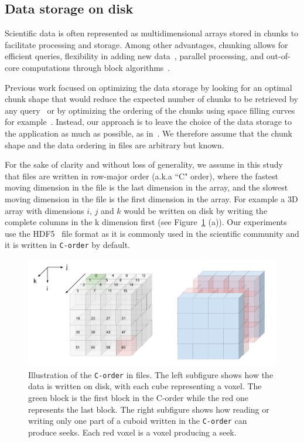 \documentclass[conference]{IEEEtran}
\begin{document}
\subsection{Data storage on disk}
Scientific data is often represented as multidimensional arrays stored in
chunks to facilitate processing and storage. Among other advantages, chunking
allows for efficient queries, flexibility in adding new
data~\cite{optimal_chuking}, parallel processing, and out-of-core
computations through block algorithms~\cite{matthew_rocklin-proc-scipy-2015}.

Previous work focused on optimizing the data storage by looking for an optimal
chunk shape that would reduce the expected number of chunks to be retrieved by
any query~\cite{optimal_chuking} or by optimizing the ordering of the chunks
using space filling curves for example~\cite{optimal_chuking, openconnectomecluster}.
Instead, our approach is to leave the choice of the
data storage to the application as much as possible, as in~\cite{seqalgorithms}.
We therefore assume that the chunk shape and the data ordering in files are
arbitrary but known.

For the sake of clarity and without loss of generality,
 we assume in this study that files are written in row-major order (a.k.a
``C" order), where the fastest moving dimension in the file is the last
dimension in the array, and the slowest moving dimension in the file is the first
dimension in the array. For example a 3D array with dimensions $i$, $j$ and $k$
would be written on disk by writing the complete columns in the k dimension first
(see Figure~\ref{fig:seeks_and_rowmajor} (a)).
Our experiments use the HDF5~\cite{hdf5} file format as it is commonly used in the
scientific community and it is written in \texttt{C-order} by default.

\begin{figure}[h]
  \centering
  \includegraphics[scale=0.35]{./figures/new/figure_1.png}
  \caption{Illustration of the \texttt{C-order} in files. The left subfigure
  shows how the data is written on disk, with each cube representing a voxel.
  The green block is the first block in the C-order while the red one represents the last block.
  The right subfigure shows how reading or writing only one part of a cuboid written
  in the \texttt{C-order} can produce seeks. Each red voxel is a voxel producing a seek.}
  \label{fig:seeks_and_rowmajor}
\end{figure}
\end{document}
